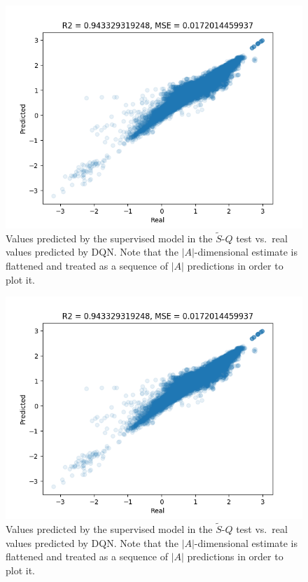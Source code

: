 %
%
\begin{figure}
    \includegraphics[width=\textwidth]{pictures/experiments/FQ_test_pong}
    \centering
    \caption[Predictions of $\tilde{S}$-$Q$ mapping experiment]{Values predicted 
	     by the supervised model in the $\tilde{S}$-$Q$ test vs.\ real values
	     predicted by DQN. Note that the $|A|$-dimensional estimate is 
	     flattened and treated as a sequence of $|A|$ predictions in order to
	     plot it.}
    \label{f:FQ_test_breakout}
\end{figure}
%
%
\begin{figure}
    \includegraphics[width=\textwidth]{pictures/experiments/FQ_test_pong}
    \centering
    \caption[Predictions of $\tilde{S}$-$Q$ mapping experiment]{Values predicted 
	     by the supervised model in the $\tilde{S}$-$Q$ test vs.\ real values
	     predicted by DQN. Note that the $|A|$-dimensional estimate is 
	     flattened and treated as a sequence of $|A|$ predictions in order to
	     plot it.}
    \label{f:FQ_test_pong}
\end{figure}
